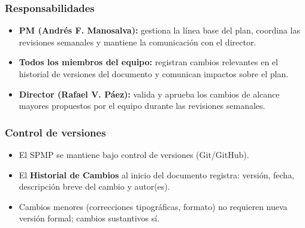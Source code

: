 \documentclass[12pt,oneside]{report}
\begin{document}
    \subsubsection*{Responsabilidades}
    \begin{itemize}

      \item \textbf{PM (Andrés F. Manosalva):} gestiona la línea base del plan, coordina las revisiones semanales y mantiene la comunicación con el director.
      \item \textbf{Todos los miembros del equipo:} registran cambios relevantes en el historial de versiones del documento y comunican impactos sobre el plan.
      \item \textbf{Director (Rafael V. Páez):} valida y aprueba los cambios de alcance mayores propuestos por el equipo durante las revisiones semanales.
    \end{itemize}

    \subsubsection*{Control de versiones}
    \begin{itemize}
      \item El SPMP se mantiene bajo control de versiones (Git/GitHub).
      \item El \textbf{Historial de Cambios} al inicio del documento registra: versión, fecha, descripción breve del cambio y autor(es).
      \item Cambios menores (correcciones tipográficas, formato) no requieren nueva versión formal; cambios sustantivos sí.
    \end{itemize}

\end{document}
